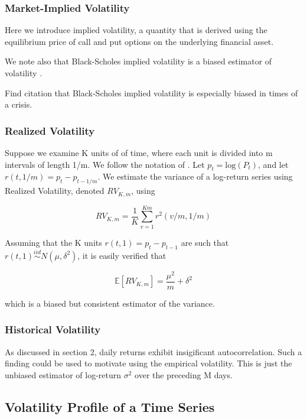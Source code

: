 \documentclass[11pt]{article}
\newcommand{\simiid}{\stackrel{iid}{\sim}} %
\def\E{\mathbb{E}} %
\theoremstyle{definition}
\begin{document}
\subsubsection{Market-Implied Volatility}

Here we introduce implied volatility, a quantity that is derived using the equilibrium price of call and put options on the underlying financial asset.

We note also that Black-Scholes implied volatility is a biased estimator of volatility \citep{christensen1998relation}.

Find citation that Black-Scholes implied volatility is especially biased in times of a crisis.

\subsubsection{Realized Volatility}

Suppose we examine K units of of time, where each unit is divided into m intervals of length 1/m.  We follow the notation of  \citet{andersen2009realized}. Let $p_{t} = \text{log}(P_{t})$, and let $r(t, 1/m) = p_{t} - p_{t-1/m}$.  We estimate the variance of a log-return series using Realized Volatility, denoted $RV_{K,m}$, using

$$RV_{K,m} = \frac{1}{K}\sum^{Km}_{v=1}r^{2}(v/m,1/m)$$

Assuming that the K units $r(t, 1) = p_{t} - p_{t-1}$ are such that $r(t, 1) \simiid N(\mu, \delta^{2})$, it is easily verified that 

$$\E[RV_{K,m}] = \frac{\mu^{2}}{m} + \delta^{2}$$

which is a biased but consistent estimator of the variance.

\subsubsection{Historical Volatility}

As discussed in section 2, daily returns exhibit insigificant autocorrelation.  Such a finding could be used to motivate using the empirical volatility.  This is just the unbiased estimator of log-return $\sigma^{2}$ over the preceding M days.

\subsection{Volatility Profile of a Time Series}
\label{Volatility Profile of a Time Series}
\end{document}
